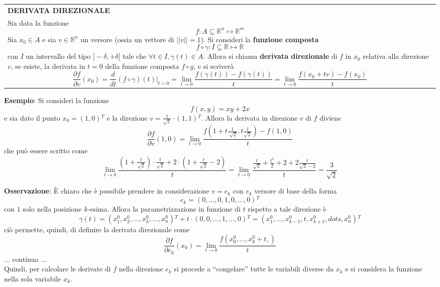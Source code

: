 \documentclass[a4paper]{extarticle}
\newcommand{\quotes}[1]{``#1''}
\renewcommand\arraystretch{}
\begin{document}
\vspace{1em}
\setlength{\tabcolsep}{14pt}
\renewcommand{\arraystretch}{2}
\noindent
\begin{tabularx}{\textwidth}{@{}|P|@{}}
    \hline
    {\textbf{DERIVATA DIREZIONALE}}\\
    \parbox{\linewidth}{Sia data la funzione
    \[f : A \subseteq \mathbb{R}^n \longmapsto \mathbb{R}^m\]
    Sia $x_0 \in A$ e sia $v \in \mathbb{R}^n$ un versore (ossia un vettore di $\vert \vert v \vert \vert = 1$).\\
    Si consideri la \textbf{funzione composta}
    \[f \circ \gamma : I \subseteq \mathbb{R} \longmapsto \mathbb{R}\]
    con $I$ un intervallo del tipo $]-\delta,+\delta[$ tale che $\forall t \in I, \gamma(t) \in A$.\\
    Allora si chiama \textbf{derivata direzionale} di $f$ in $x_0$ relativa alla direzione $v$, se esiste, la derivata in $t=0$ della funzione composta $f \circ g$, e si scriverà
    \[\frac{\partial f}{\partial v} (x_0) = \frac{d}{dt} (f \circ \gamma)(t) \vert_{t=0} = \lim_{t \to 0} \frac{f(\gamma(t)) - f(\gamma(t))}{t} = \lim_{t \to 0} \frac{f(x_0+tv) - f(x_0)}{t}\]
    \vspace{3mm}}\\
    \hline
\end{tabularx}

\vspace{2em}
\noindent
\textbf{Esempio}: Si consideri la funzione
\[f(x,y)=xy+2x\]
e sia dato il punto $x_0=(1,0){^T}$ e la direzione $\displaystyle{v=\frac{1}{\sqrt{2}} \cdot (1,1){^T}}$. Allora la derivata in direzione $v$ di $f$ diviene
\[\frac{\partial f}{\partial v}(1,0) = \lim_{t \to 0} \frac{f\left(1+t \frac{1}{\sqrt[]{2}},t\frac{1}{\sqrt{2}}\right) - f(1,0)}{t}\]
che può essere scritto come
\[\lim_{t \to 0} \dfrac{(1+\frac{t}{\sqrt{2}}) \cdot \frac{t}{\sqrt{2}} + 2 \cdot \left(1+\frac{t}{\sqrt{2}} - 2\right)}{t} = \lim_{t \to 0} \dfrac{\frac{t}{\sqrt{2}} + \frac{t^2}{2} + 2 + 2 \frac{t}{\sqrt{2} - 2}}{t} = \frac{3}{\sqrt{2}}\]

\vspace{1em}
\noindent
\textbf{Osservazione}: È chiaro che è possibile prendere in considerazione $v=e_k$ con $e_k$ versore di base della forma
\[e_k=(0,\dots,0,1,0,\dots,0){^T}\]
con $1$ solo nella posizione $k$-esima. Allora la parametrizzazione in funzione di $t$ rispetto a tale direzione è
\[\gamma(t)=(x_1^0,x_2^0,\dots,x_k^0,\dots,x_n^0){^T} + t \cdot (0,0,\dots,1,\dots,0){^T} = (x_1^0,\dots,x_{k-1}^0,t,x_{k+1}^0,dots,x_n^0){^T}\]
ciò permette, quindi, di definire la derivata direzionale come
\[\frac{\partial f}{\partial e_k}(x_0) = \lim_{t \to 0} \frac{f(x_0^0,\dots,x_k^0+t,)}{t}\]
... continua ...\\
Quindi, per calcolare le derivate di $f$ nella direzione $e_k$ si procede a \quotes{congelare} tutte le variabili diverse da $x_k$ e si considera la funzione nella sola variabile $x_k$.
\end{document}
